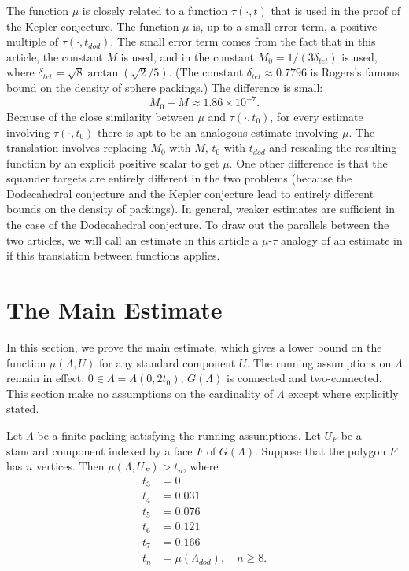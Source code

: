 \begin{remark}\label{rem:sq} The function $\mu$ is closely related to a function
$\tau(\cdot,t)$ that is used in the proof of the Kepler conjecture.  The
function $\mu$ is, up to a small error term, a positive multiple
of $\tau(\cdot,t_{dod})$.   The small
error term comes from the fact that in this article, the constant
$M$ is used, and in \cite{DCG} the constant
$M_0=1/(3 \delta_{tet})$ is used, where $\delta_{tet} = \sqrt8 \arctan(\sqrt2/5)$.  (The constant $\delta_{tet}\approx 0.7796$ is Rogers's famous bound on the density of sphere packings.)  The difference is small:
   $$M_0 - M \approx 1.86 \times 10^{-7}.$$
Because of the close similarity between $\mu$ and $\tau(\cdot,t_0)$,
for every estimate involving $\tau(\cdot,t_0)$ there is apt to
be an analogous estimate involving $\mu$.  The translation involves
replacing $M_0$ with $M$, $t_0$ with $t_{dod}$ and rescaling the
resulting function by an explicit positive scalar to get $\mu$.
One other difference is that the squander targets are entirely different
in the two problems (because the Dodecahedral conjecture and the
Kepler conjecture lead to entirely different bounds on the density
of packings).  In general, weaker estimates are sufficient in the
case of the Dodecahedral conjecture.
To draw out the parallels between the two articles, we will call
an estimate in this article a $\mu$-$\tau$ analogy of an estimate
in \cite{DCG} if this translation between functions applies.
\end{remark}



\section{The Main Estimate}

In this section, we prove the main estimate, which gives a lower
bound on the function $\mu(\Lambda,U)$ for any standard component $U$.
The running
assumptions on $\Lambda$ remain in effect: $0\in\Lambda= \Lambda(0,2t_0)$, $G(\Lambda)$ is connected and two-connected.  This section make
no assumptions on the cardinality 
of $\Lambda$ except where explicitly stated.

\begin{theorem}\label{thm:main}  
Let $\Lambda$ be a finite packing satisfying the
running assumptions.  Let $U_F$ be a standard component indexed by
a face $F$ of $G(\Lambda)$.  Suppose that the polygon 
$F$ has $n$ vertices.  Then
   $\mu(\Lambda,U_F) > t_n$, where 
$$
\begin{array}{lll}
 t_3 &= 0\\
 t_4 &= 0.031\\
 t_5 &= 0.076\\
 t_6 &= 0.121\\
 t_7 &= 0.166\\
 t_n &= \mu(\Lambda_{dod}),\quad n\ge 8.
\end{array}
$$
\end{theorem}

